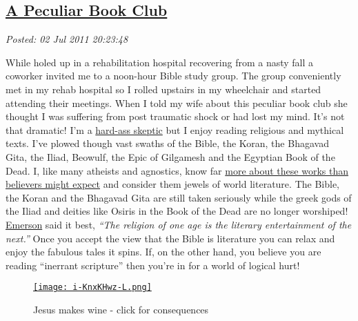 %

\subsection*{\href{https://bakerjd99.wordpress.com/2011/07/02/a-peculiar-book-club/}{A Peculiar Book Club}}


\noindent\emph{Posted: 02 Jul 2011 20:23:48}
\vspace{6pt}

While holed up in a rehabilitation hospital recovering from a nasty fall
a coworker invited me to a noon-hour Bible study group. The group
conveniently met in my rehab hospital so I rolled upstairs in my
wheelchair and started attending their meetings. When I told my wife
about this peculiar book club she thought I was suffering from post
traumatic shock or had lost my mind. It's not that dramatic! I'm a
\href{http://bakerjd99.wordpress.com/2009/10/29/hard-ass-skeptic-rules/}{hard-ass
skeptic} but I enjoy reading religious and mythical texts. I've plowed
though vast swaths of the Bible, the Koran, the Bhagavad Gita, the
Iliad, Beowulf, the Epic of Gilgamesh and the Egyptian Book of the Dead.
I, like many atheists and agnostics, know far
\href{http://articles.latimes.com/2010/sep/28/nation/la-na-religion-survey-20100928}{more
about these works than believers might expect} and consider them jewels
of world literature. The Bible, the Koran and the Bhagavad Gita are
still taken seriously while the greek gods of the Iliad and deities like
Osiris in the Book of the Dead are no longer worshiped!
\href{http://www.emersoncentral.com/poems/index.htm}{Emerson} said it
best, \emph{``The religion of one age is the literary entertainment of
the next.''} Once you accept the view that the Bible is literature you
can relax and enjoy the fabulous tales it spins. If, on the other hand,
you believe you are reading ``inerrant scripture'' then you're in for a
world of logical hurt!


\captionsetup[figure]{labelformat=empty}
\begin{figure}[htbp]
\centering
\href{http://www.smbc-comics.com/index.php?db=comics\&id=1871\#comic}{\texttt{[image: i-KnxKHwz-L.png]}}
\caption{Jesus  makes wine - click for  consequences}
\label{fig:1405X0}
\end{figure}


